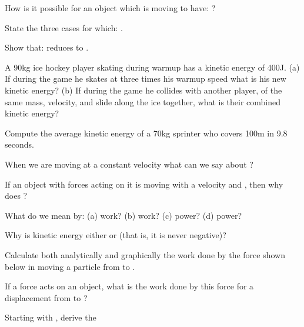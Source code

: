 {\begin{one-digit-list}
\item [e.] How is it possible for an object which is moving to have:
           ? 
\item [f.] State the three cases for which: . 
\item [g.] Show that:  reduces to . 
\item [h.] A 90\unit{kg} ice hockey player skating during warmup has a kinetic
           energy of 400\unit{J}.
           (a) If during the game he skates at three times his warmup speed
           what is his new kinetic energy?
           (b) If during the game he collides with another player, of the
           same mass, velocity, and slide along the ice together, what is
           their combined kinetic energy? 
\item [i.] Compute the average kinetic energy of a 70\unit{kg} sprinter who
           covers 100\unit{m} in 9.8\,\unit{seconds}. 
\item [j.] When we are moving at a constant velocity what can we say about
           ? 
\item [k.] If an object with forces acting on it is moving with a velocity
            and , then why does
           ? 
\item [l.] What do we mean by: (a) \Quote{\m{+}} work? (b) \Quote{\m{-}} work?
           (c) \Quote{\m{+}} power? (d) \Quote{\m{-}} power? 
\item [m.] Why is kinetic energy either  or \m{+} (that is, it is never
           negative)? 
\item [n.] Calculate both analytically and graphically the work done by the
           force shown below in moving a particle from  to .
           \newline{} 
\item [o.] If a force  acts on an object,
           what is the work done by this force for a displacement from 
           to ? 
\item [p.] Starting with , derive the

\end{one-digit-list}}
